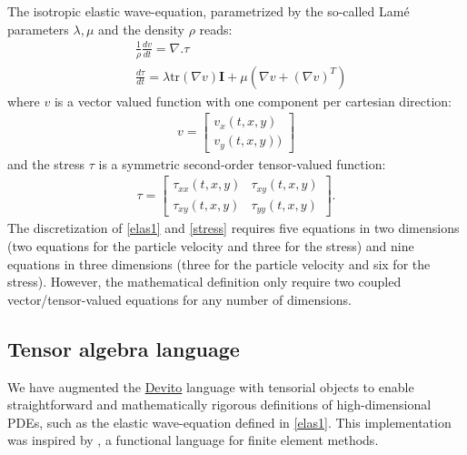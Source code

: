 \documentclass[10pt, conference]{IEEEtran}
\newcommand{\devito}{\href{https://github.com/devitocodes/devito}{Devito} }
\begin{document}
The isotropic elastic wave-equation, parametrized by the so-called Lamé parameters
$\lambda, \mu$ and the density $\rho$ reads:
%
\begin{equation}
\begin{aligned}
&\frac{1}{\rho}\frac{dv}{dt} = \nabla . \tau \\
&\frac{d \tau}{dt} = \lambda \mathrm{tr}(\nabla v) \mathbf{I}  + \mu (\nabla v + (\nabla v)^T)
\end{aligned}
\label{elas1}
\end{equation}
%
\noindent
 where $v$ is a vector valued function with one component per cartesian
direction:
%
\begin{equation}
\begin{split}
v =  \begin{bmatrix} v_x(t, x, y) \\ v_y(t, x, y)) \end{bmatrix}
\end{split}
\label{partvel}
\end{equation}
%
 and the stress $\tau$ is a symmetric second-order tensor-valued
function:
%
\begin{equation}
\begin{aligned}
    \tau = \begin{bmatrix}\tau_{xx}(t, x, y) & \tau_{xy}(t, x, y)\\\tau_{xy}(t, x, y) & \tau_{yy}(t, x, y)\end{bmatrix}.
\end{aligned}
\label{stress}
\end{equation}
%
 The discretization of \eqref{elas1} and \eqref{stress} requires five
equations in two dimensions (two equations for the particle velocity and
three for the stress) and nine equations in three dimensions (three for the particle velocity
and six for the stress). However, the mathematical
definition only require two coupled vector/tensor-valued equations for
any number of dimensions.

\subsection{Tensor algebra language}\label{tensor-algebra-language}

We have augmented the \devito language with tensorial objects to enable
straightforward and mathematically rigorous definitions of
high-dimensional PDEs, such as the elastic wave-equation defined in
\eqref{elas1}. This implementation was inspired by \cite{ufl}, a
functional language for finite element methods.
\end{document}
